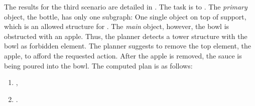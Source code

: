 The results for the third scenario are detailed in . 
The task is to .
The \emph{primary} object, the bottle, has only one subgraph: One single object on top of support, which is an allowed structure for .
The \emph{main} object, however, the bowl is obstructed with an apple.
Thus, the planner detects a tower structure with the bowl as forbidden element.
The planner suggests to remove the top element, the apple, to afford the requested action.
After the apple is removed, the sauce is being poured into the bowl.
The computed plan is as follows:

\begin{enumerate}
  \item {},
  \item {}.
\end{enumerate}

